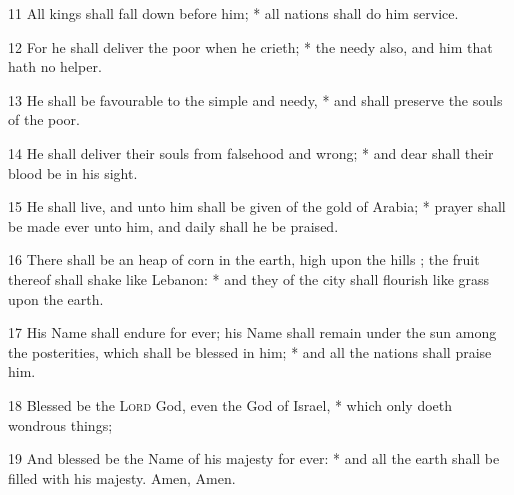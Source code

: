 11 All kings shall fall down before him; * all nations shall do him service.\par
12 For he shall deliver the poor when he crieth; * the needy also, and him that hath no helper.\par
13 He shall be favourable to the simple and needy, * and shall preserve the souls of the poor.\par
14 He shall deliver their souls from falsehood and wrong; * and dear shall their blood be in his sight.\par
15 He shall live, and unto him shall be given of the gold of Arabia; * prayer shall be made ever unto him, and daily shall he be praised.\par
16 There shall be an heap of corn in the earth, high upon the hills ; the fruit thereof shall shake like Lebanon: * and they of the city shall flourish like grass upon the earth.\par
17 His Name shall endure for ever; his Name shall remain under the sun among the posterities, which shall be blessed in him; * and all the nations shall praise him.\par
18 Blessed be the {\textsc{Lord}} God, even the God of Israel, * which only doeth wondrous things;\par
19 And blessed be the Name of his majesty for ever: * and all the earth shall be filled with his majesty. Amen, Amen.
